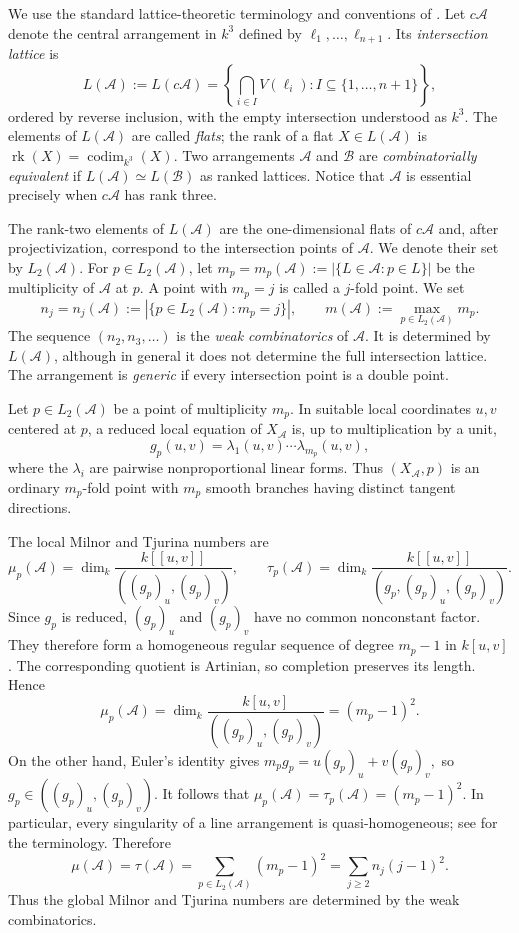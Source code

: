 \documentclass[11pt]{amsart}   %
\theoremstyle{definition}
\def\A{{\mathcal A}}
\def\B{{\mathcal B}}
\begin{document}
We use the standard lattice-theoretic terminology and conventions of \cite[Chapter~2]{Orlik-Terao}. Let $c\A$ denote the central arrangement in $k^3$ defined by $\ell_1,\ldots,\ell_{n+1}$. Its \emph{intersection lattice} is
\[
L(\A):=L(c\A)
=
\left\{
\bigcap_{i\in I}V(\ell_i): I\subseteq\{1,\ldots,n+1\} \right\},
\]
ordered by reverse inclusion, with the empty intersection understood as $k^3$. The elements of $L(\A)$ are called \emph{flats}; the rank of a flat $X\in L(\A)$ is $\operatorname{rk}(X)=\operatorname{codim}_{k^3}(X)$. Two arrangements $\A$ and $\B$ are \emph{combinatorially equivalent} if $L(\A)\simeq L(\B)$ as ranked lattices. Notice that $\A$ is essential precisely when $c\A$ has rank three.

The rank-two elements of $L(\A)$ are the one-dimensional flats of $c\A$ and, after projectivization, correspond to the intersection points of $\A$. We denote their set by $L_2(\A)$. For $p\in L_2(\A)$, let $m_p=m_p(\A):=|\{L\in\A:p\in L\}|$ be the multiplicity of $\A$ at $p$. A point with $m_p=j$ is called a $j$-fold point. We set
\[
n_j=n_j(\A):=
|\{p\in L_2(\A):m_p=j\}|, \qquad m(\A):=\max_{p\in L_2(\A)}m_p.
\]
The sequence $(n_2,n_3,\ldots)$ is the \emph{weak combinatorics} of $\A$. It is determined by $L(\A)$, although in general it does not determine the full intersection lattice. The arrangement is \emph{generic} if every intersection point is a double point.

Let $p\in L_2(\A)$ be a point of multiplicity $m_p$. In suitable local coordinates $u,v$ centered at $p$, a reduced local equation of $X_\A$ is, up to multiplication by a unit,
\[
g_p(u,v)
=
\lambda_1(u,v)\cdots\lambda_{m_p}(u,v),
\]
where the $\lambda_i$ are pairwise nonproportional linear forms. Thus $(X_\A,p)$ is an ordinary $m_p$-fold point with $m_p$ smooth branches having distinct tangent directions.

The local Milnor and Tjurina numbers are
\[
\mu_p(\A)
=
\dim_k
\frac{k[[u,v]]}{((g_p)_u,(g_p)_v)},
\qquad
\tau_p(\A)
=
\dim_k
\frac{k[[u,v]]}{(g_p,(g_p)_u,(g_p)_v)}.
\]
Since $g_p$ is reduced, $(g_p)_u$ and $(g_p)_v$ have no common nonconstant factor. They therefore form a homogeneous regular sequence of degree $m_p-1$ in $k[u,v]$. The corresponding quotient is Artinian, so completion preserves its length. Hence
\[
\mu_p(\A)
=
\dim_k
\frac{k[u,v]}{((g_p)_u,(g_p)_v)}
=
(m_p-1)^2.
\]
On the other hand, Euler's identity gives $m_pg_p=u(g_p)_u+v(g_p)_v,$ so $g_p\in((g_p)_u,(g_p)_v)$. It follows that $\mu_p(\A)=\tau_p(\A)=(m_p-1)^2.$ In particular, every singularity of a line arrangement is quasi-homogeneous; see \cite{Saito} for the terminology. Therefore
\[
\mu(\A)=\tau(\A)
=
\sum_{p\in L_2(\A)}(m_p-1)^2
=
\sum_{j\geq2}n_j(j-1)^2.
\]
Thus the global Milnor and Tjurina numbers are determined by the weak combinatorics.
\end{document}
